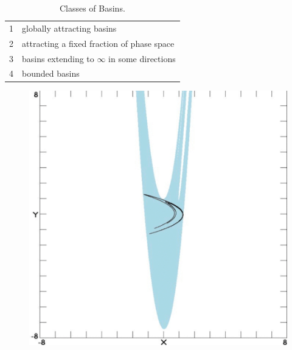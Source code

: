 \begin{table}[ht]
\centering
\caption[Classes of Basins]{Classes of Basins. \cite{classify}}
\begin{tabular}{l l}
\hline
1       &  globally attracting basins\\
2       &  attracting a fixed fraction of phase space\\
3       & basins extending to $\infty$ in some directions\\
4       & bounded basins\\                
\hline
\end{tabular}
\label{t:class}
\end{table}
\begin{figure}
    \centering
    \iffalse
    {{\includegraphics*[width=0.4\linewidth]{figures/IMG_0769.jpg} }}%


\end{figure}
